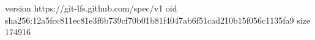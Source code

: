 version https://git-lfs.github.com/spec/v1
oid sha256:12a5fcc811ec81e3f6b739cf70b01b81f4047ab6f51cad210b15f056c1135fa9
size 174916

